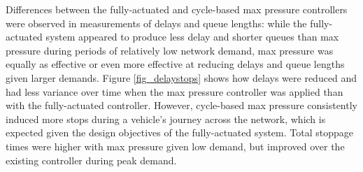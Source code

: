 Differences between the fully-actuated and cycle-based max pressure controllers were observed in measurements of delays and queue lengths: while the fully-actuated system appeared to produce less delay and shorter queues than max pressure during periods of relatively low network demand, max pressure was equally as effective or even more effective at reducing delays and queue lengths given larger demands. Figure \ref{fig_delaystops} shows how delays were reduced and had less variance over time when the max pressure controller was applied than with the fully-actuated controller. 
However, cycle-based max pressure consistently induced more stops during a vehicle's journey across the network, which is expected given the design objectives of the fully-actuated system. Total stoppage times were higher with max pressure given low demand, but improved over the existing controller during peak demand. 



